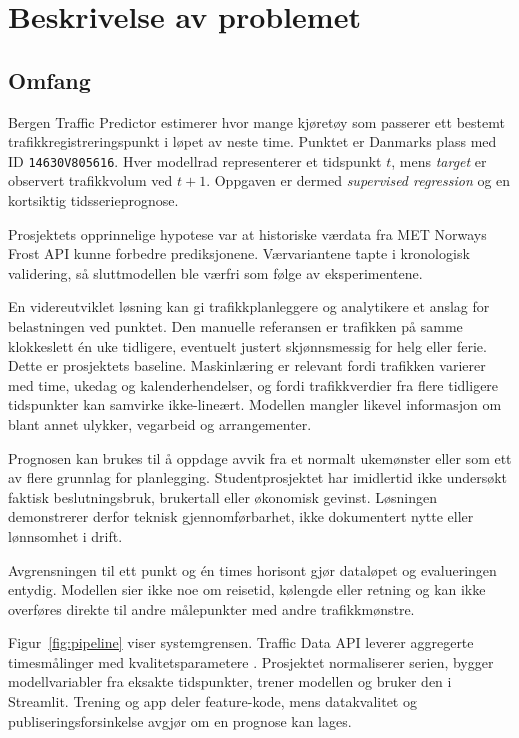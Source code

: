 \section{Beskrivelse av problemet}

\subsection{Omfang}

Bergen Traffic Predictor estimerer hvor mange kjøretøy som passerer ett bestemt
trafikkregistreringspunkt i løpet av neste time. Punktet er Danmarks plass med ID
\texttt{14630V805616}. Hver modellrad representerer et tidspunkt $t$, mens
\emph{target} er observert trafikkvolum ved $t+1$. Oppgaven er dermed
\emph{supervised regression} og en kortsiktig tidsserieprognose.

Prosjektets opprinnelige hypotese var at historiske værdata fra MET Norways Frost
API kunne forbedre prediksjonene. Værvariantene tapte i kronologisk validering, så
sluttmodellen ble værfri som følge av eksperimentene.

En videreutviklet løsning kan gi trafikkplanleggere og analytikere et anslag for
belastningen ved punktet. Den manuelle referansen er trafikken på samme klokkeslett
én uke tidligere, eventuelt justert skjønnsmessig for helg eller ferie. Dette er
prosjektets baseline. Maskinlæring er relevant fordi trafikken varierer med time,
ukedag og kalenderhendelser, og fordi trafikkverdier fra flere tidligere
tidspunkter kan samvirke ikke-lineært. Modellen mangler likevel informasjon om blant annet ulykker,
vegarbeid og arrangementer.

Prognosen kan brukes til å oppdage avvik fra et normalt ukemønster eller som ett av
flere grunnlag for planlegging. Studentprosjektet har imidlertid ikke undersøkt
faktisk beslutningsbruk, brukertall eller økonomisk gevinst. Løsningen demonstrerer
derfor teknisk gjennomførbarhet, ikke dokumentert nytte eller lønnsomhet i drift.

Avgrensningen til ett punkt og én times horisont gjør dataløpet og evalueringen
entydig. Modellen sier ikke noe om reisetid, kølengde eller retning og kan ikke
overføres direkte til andre målepunkter med andre trafikkmønstre.

Figur~\ref{fig:pipeline} viser systemgrensen. Traffic Data API leverer aggregerte
timesmålinger med kvalitetsparametere \cite{vegvesen-traffic-api}. Prosjektet
normaliserer serien, bygger modellvariabler fra eksakte tidspunkter, trener modellen
og bruker den i Streamlit. Trening og app deler feature-kode, mens datakvalitet og
publiseringsforsinkelse avgjør om en prognose kan lages.

